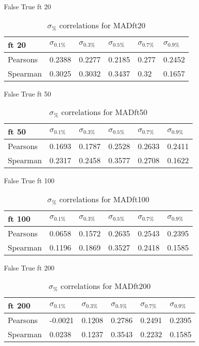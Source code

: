 \documentclass{sig-alternate}
\begin{document}
False True ft 20
\begin{table}[h!]
\centering
\caption{$\sigma_{\%}$ correlations for MADft20}
\begin{tabular}{|l|l|l|l|l|l|}
\hline
ft 20 & $\sigma_{0.1\%}$ & $\sigma_{0.3\%}$ & $\sigma_{0.5\%}$ & $\sigma_{0.7\%}$ & $\sigma_{0.9\%}$ \\ \hline
Pearsons  & 0.2388 & 0.2277 & 0.2185 & 0.277 & 0.2452 \\ \hline
Spearman  & 0.3025 & 0.3032 & 0.3437 & 0.32 & 0.1657 \\ \hline
\end{tabular}
\end{table}
False True ft 50
\begin{table}[h!]
\centering
\caption{$\sigma_{\%}$ correlations for MADft50}
\begin{tabular}{|l|l|l|l|l|l|}
\hline
ft 50 & $\sigma_{0.1\%}$ & $\sigma_{0.3\%}$ & $\sigma_{0.5\%}$ & $\sigma_{0.7\%}$ & $\sigma_{0.9\%}$ \\ \hline
Pearsons  & 0.1693 & 0.1787 & 0.2528 & 0.2633 & 0.2411 \\ \hline
Spearman  & 0.2317 & 0.2458 & 0.3577 & 0.2708 & 0.1622 \\ \hline
\end{tabular}
\end{table}
False True ft 100
\begin{table}[h!]
\centering
\caption{$\sigma_{\%}$ correlations for MADft100}
\begin{tabular}{|l|l|l|l|l|l|}
\hline
ft 100 & $\sigma_{0.1\%}$ & $\sigma_{0.3\%}$ & $\sigma_{0.5\%}$ & $\sigma_{0.7\%}$ & $\sigma_{0.9\%}$ \\ \hline
Pearsons  & 0.0658 & 0.1572 & 0.2635 & 0.2543 & 0.2395 \\ \hline
Spearman  & 0.1196 & 0.1869 & 0.3527 & 0.2418 & 0.1585 \\ \hline
\end{tabular}
\end{table}
False True ft 200
\begin{table}[h!]
\centering
\caption{$\sigma_{\%}$ correlations for MADft200}
\begin{tabular}{|l|l|l|l|l|l|}
\hline
ft 200 & $\sigma_{0.1\%}$ & $\sigma_{0.3\%}$ & $\sigma_{0.5\%}$ & $\sigma_{0.7\%}$ & $\sigma_{0.9\%}$ \\ \hline
Pearsons  & -0.0021 & 0.1208 & 0.2786 & 0.2491 & 0.2395 \\ \hline
Spearman  & 0.0238 & 0.1237 & 0.3543 & 0.2232 & 0.1585 \\ \hline
\end{tabular}
\end{table}
\end{document}
